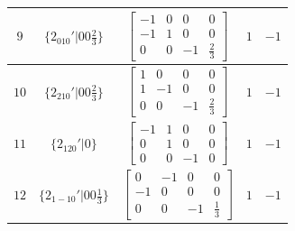\documentclass[fleqn,8pt]{jsarticle}
\begin{document}
\begin{longtable}{ccccc}
$ 9 $ & $ \{2{}_{010}{}'|0 0 \frac{2}{3}\} $ & $ \begin{bmatrix} -1 & 0 & 0 & 0 \\ -1 & 1 & 0 & 0 \\ 0 & 0 & -1 & \frac{2}{3} \end{bmatrix} $ & $ 1 $ & $ -1 $ \\ \hline
$ 10 $ & $ \{2{}_{210}{}'|0 0 \frac{2}{3}\} $ & $ \begin{bmatrix} 1 & 0 & 0 & 0 \\ 1 & -1 & 0 & 0 \\ 0 & 0 & -1 & \frac{2}{3} \end{bmatrix} $ & $ 1 $ & $ -1 $ \\ \hline
$ 11 $ & $ \{2{}_{120}{}'|0\} $ & $ \begin{bmatrix} -1 & 1 & 0 & 0 \\ 0 & 1 & 0 & 0 \\ 0 & 0 & -1 & 0 \end{bmatrix} $ & $ 1 $ & $ -1 $ \\ \hline
$ 12 $ & $ \{2{}_{1-10}{}'|0 0 \frac{1}{3}\} $ & $ \begin{bmatrix} 0 & -1 & 0 & 0 \\ -1 & 0 & 0 & 0 \\ 0 & 0 & -1 & \frac{1}{3} \end{bmatrix} $ & $ 1 $ & $ -1 $ \\
\end{longtable}
\end{document}
